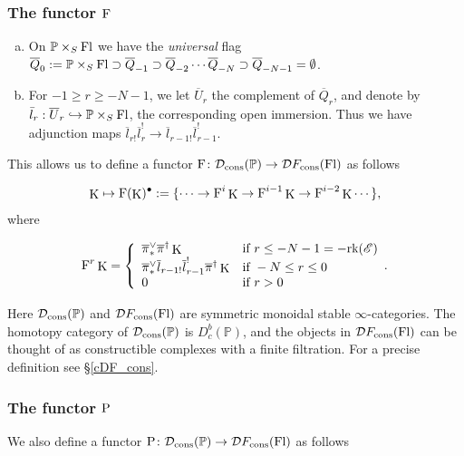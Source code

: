 \documentclass[12pt, reqno]{amsart}
\theoremstyle{plain}
\theoremstyle{definition}
\theoremstyle{definition}
\newcommand{\bbP}{{\mathbb P}}
\newcommand{\cD}{{\mathcal D}}
\newcommand{\sE}{{\mathscr E}}
\DeclareMathOperator{\KK}{K}
\begin{document}
\subsubsection{The functor $\textup{F}$}
\begin{enumerate}[(a)]
    \item On $\bbP \times_S \textup{Fl}$ we have the \textit{universal} flag $\overline{Q}_{0}:=\bbP \times_S \textup{Fl} \supset \overline{Q}_{-1} \supset \overline{Q}_{-2} \cdots \overline{Q}_{-N} \supset \overline{Q}_{-N-1}=\emptyset$. 
    \item  For $-1 \geq r \geq -N-1$, we let $\overline{U}_{r}$ the complement of $\overline{Q}_{r}$, and denote by $\bar{l}_{r}:\overline{U}_{r} \hookrightarrow \bbP \times_S \textup{Fl}$, the corresponding open immersion. Thus we have adjunction maps $\overline{l}_{r!}\overline{l}_{r}^{!} \to \overline{l}_{r-1!}\overline{l}^{!}_{r-1}$.
\end{enumerate}

This allows us to define a functor $\textup{F} \colon \cD_{\textup{cons}}(\bbP) \to \cD F_{\textup{cons}}(\textup{Fl})$ as follows

\[
\KK \mapsto \textup{F}(\KK)^{\bullet}:=\{\cdots \to \textup{F}^{i}\KK \to \textup{F}^{i-1}\KK \to \textup{F}^{i-2}\KK \cdots\},
\]
\noindent where 

\begin{center}
   \begin{equation}\label{filt_defn_intro}
       \textup{F}^{r}\KK=\left \{
	\begin{array}{ll}
		\overline{\pi}^{\vee}_{*}\overline{\pi}^{\dagger}\KK   & \mbox{if } r \leq -N-1=-\textup{rk}(\sE) \\
		\overline{\pi}^{\vee}_{*}\overline{l}_{r-1!}\overline{l}_{r-1}^!\overline{\pi}^{\dagger}\KK & \mbox{if } -N \leq r \leq 0 \\
        0 & \mbox{if } r>0
	\end{array}.
\right.
\end{equation}
\end{center}
Here $\cD_{\textup{cons}}(\bbP)$ and $\cD F_{\textup{cons}}(\textup{Fl})$ are symmetric monoidal stable $\infty$-categories. The homotopy category of $\cD_{\textup{cons}}(\bbP)$ is $D^b_c(\bbP)$, and the objects in $\cD F_{\textup{cons}}(\textup{Fl})$ can be thought of as constructible complexes with a finite filtration. For a precise definition see \S \ref{cDF_cons}.




\subsubsection{The functor $\textup{P}$}
We also define a functor $\textup{P} \colon \cD_{\textup{cons}}(\bbP) \to \cD F_{\textup{cons}}(\textup{Fl})$ as follows
\end{document}
